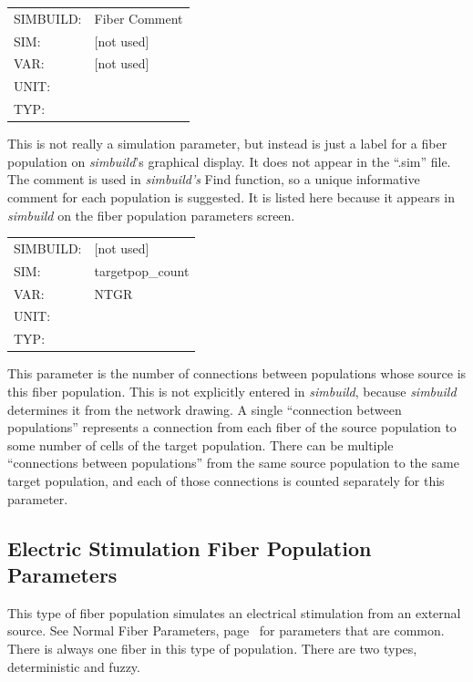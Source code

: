 \documentclass[12pt,openany,oneside]{book}
\newcommand{\tiref}[1]{#1, page~\pageref{#1}}
\newcommand{\prog}[1]{\textit{{#1}}}
\newcommand{\ext}[1]{{{``.#1''}}}
\newcommand{\inquotes}[1]{{{``#1''}}}
\begin{document}
\begin{flushleft}
\begin{tabular}{@{}ll@{}}
SIMBUILD: & Fiber Comment\\
SIM: & [not used]\\
VAR: & [not used]\\
UNIT: &\\
TYP: &\\
\end{tabular}
\end{flushleft}
\noindent
This is not really a simulation parameter, but instead is just a label for
a fiber population on \prog{simbuild}'s graphical display. It does not
appear in the \ext{sim} file.  The comment is used in \prog{simbuild's}
Find function, so a unique informative comment for each population is
suggested.  It is listed here because it appears in \prog{simbuild} on the
fiber population parameters screen.
\filbreak
\vspace{\baselineskip}

\begin{flushleft}
\begin{tabular}{@{}ll@{}}
SIMBUILD: & [not used]\\
SIM: & targetpop\_count\\
VAR: & NTGR\\
UNIT: &\\
TYP: &\\
\end{tabular}
\end{flushleft}
\noindent
This parameter is the number of connections between populations whose
source is this fiber population. This is not explicitly entered 
in \prog{simbuild}, because \prog{simbuild} determines it from the network drawing. A
single \inquotes{connection between populations} represents a connection from
each fiber of the source population to some number of cells of the
target population. There can be multiple \inquotes{connections between
populations} from the same source population to the same target
population, and each of those connections is counted separately for
this parameter.
\filbreak
\vspace{\baselineskip}

\subsection{Electric Stimulation Fiber Population Parameters}
\label{Electric Stimulation Fiber Population Parameters}
\noindent
This type of fiber population simulates an electrical stimulation from an
external source. See \tiref{Normal Fiber Parameters} for parameters that
are common. There is always one fiber in this type of population. There are 
two types, deterministic and fuzzy.
\end{document}
